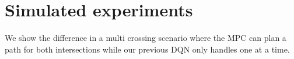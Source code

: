 


\section{Simulated experiments}
We show the difference in a multi crossing scenario where the MPC can plan a path for both intersections while our previous DQN only handles one at a time. 

